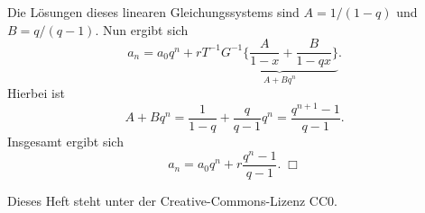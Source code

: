 \documentclass[a4paper,12pt,fleqn,twoside]{article}
\numberwithin{equation}{section}
\theoremstyle{definition}
\begin{document}
Die Lösungen dieses linearen Gleichungssystems
sind $A=1/(1-q)$ und $B=q/(q-1)$. Nun ergibt sich
\[ a_n = a_0q^n + rT^{-1} \underbrace{G^{-1}\bigg\{\frac{A}{1-x} + \frac{B}{1-qx}\bigg\}}_{A+Bq^n}.\]
Hierbei ist
\[ A+Bq^n = \frac{1}{1-q}+\frac{q}{q-1}q^n = \frac{q^{n+1}-1}{q-1}.\]
Insgesamt ergibt sich
\[ a_n = a_0q^n + r\frac{q^n-1}{q-1}.\;\Box\]

\vfill
Dieses Heft steht unter der Creative-Commons-Lizenz CC0.
\end{document}

